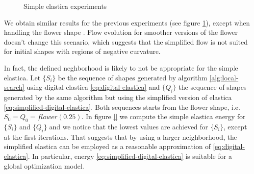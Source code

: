 \begin{figure}[h!]
{}\hspace{1em}%
\caption{Simple elastica experiments}
\label{fig:simple-elastica-experiments}
\end{figure}

We obtain similar results for the previous experiments (see figure \ref{fig:simple-elastica-experiments}), except when handling the flower shape . Flow evolution for smoother versions of the flower doesn't change this scenario, which suggests that the simplified flow is not suited for initial shapes with regions of negative curvature.

In fact, the defined neghborhood is likely to not be appropriate for the simple elastica. Let $\{S_i\}$ be the sequence of shapes generated by algorithm \ref{alg:local-search} using digital elastica \eqref{eq:digital-elastica} and $\{Q_i\}$ the sequence of shapes generated by the same algorithm but using the simplified version of elastica \eqref{eq:simplified-digital-elastica}. Both sequences starts from the flower shape, i.e. $S_0=Q_0=flower(0.25)$. In figure \ref{} we compute the simple elastica energy for $\{S_i\}$ and $\{Q_i\}$ and we notice that the lowest values are achieved for $\{S_i\}$, except at the first iterations. That suggests that by using a larger neighborhood, the simplified elastica can be employed as a reasonable approximation of \eqref{eq:digital-elastica}. In particular, energy \eqref{eq:simplified-digital-elastica} is suitable for a global optimization model.


